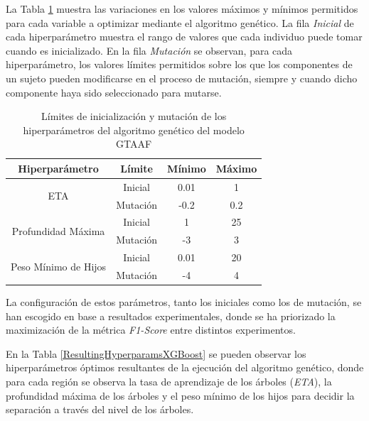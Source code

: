 La Tabla \ref{MutationXGBoostParams} muestra las variaciones en los valores máximos y mínimos permitidos para cada variable a optimizar mediante el algoritmo genético. La fila \textit{Inicial} de cada hiperparámetro muestra el rango de valores que cada individuo puede tomar cuando es inicializado. En la fila \textit{Mutación} se observan, para cada hiperparámetro, los valores límites permitidos sobre los que los componentes de un sujeto pueden modificarse en el proceso de mutación, siempre y cuando dicho componente haya sido seleccionado para mutarse.

\begin{table}[H]
	\caption{Límites de inicialización y mutación de los hiperparámetros del algoritmo genético del modelo GTAAF}
	\begin{center}
		\begin{tabular}{|c|c||c|c|}
			\hline
			\textbf{Hiperparámetro} & \textbf{Límite} & \textbf{Mínimo} & \textbf{Máximo}
			\\ \hline \hline
			
			\multirow{2}{*}{ETA} &
			Inicial  & 0.01  & 1  \\ &
			Mutación & -0.2  & 0.2 \\ \hline \hline
			\multirow{2}{*}{Profundidad Máxima} &
			Inicial  & 1   & 25  \\ &
			Mutación & -3  & 3 \\ \hline \hline
			\multirow{2}{*}{Peso Mínimo de Hijos} &
			Inicial  & 0.01   & 20  \\ &
			Mutación & -4  & 4 \\ \hline \hline
		\end{tabular}
	\end{center}

	\label{MutationXGBoostParams}
\end{table}

La configuración de estos parámetros, tanto los iniciales como los de mutación, se han escogido en base a resultados experimentales, donde se ha priorizado la maximización de la métrica \textit{F1-Score} entre distintos experimentos.

En la Tabla \ref{ResultingHyperparamsXGBoost} se pueden observar los hiperparámetros óptimos resultantes de la ejecución del algoritmo genético, donde para cada región se observa la tasa de aprendizaje de los árboles (\textit{ETA}), la profundidad máxima de los árboles y el peso mínimo de los hijos para decidir la separación a través del nivel de los árboles.

